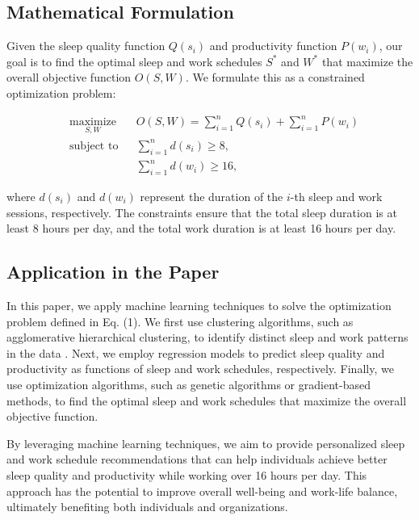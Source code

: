 \subsection{Mathematical Formulation}

Given the sleep quality function $Q(s_i)$ and productivity function $P(w_i)$, our goal is to find the optimal sleep and work schedules $S^*$ and $W^*$ that maximize the overall objective function $O(S, W)$. We formulate this as a constrained optimization problem:

\begin{equation}
\begin{aligned}
& \underset{S, W}{\text{maximize}}
& & O(S, W) = \sum_{i=1}^{n} Q(s_i) + \sum_{i=1}^{n} P(w_i) \\
& \text{subject to}
& & \sum_{i=1}^{n} d(s_i) \geq 8, \\
&&& \sum_{i=1}^{n} d(w_i) \geq 16,
\end{aligned}
\end{equation}

where $d(s_i)$ and $d(w_i)$ represent the duration of the $i$-th sleep and work sessions, respectively. The constraints ensure that the total sleep duration is at least 8 hours per day, and the total work duration is at least 16 hours per day.

\subsection{Application in the Paper}

In this paper, we apply machine learning techniques to solve the optimization problem defined in Eq. (1). We first use clustering algorithms, such as agglomerative hierarchical clustering, to identify distinct sleep and work patterns in the data \citep{uzir2020analytics}. Next, we employ regression models to predict sleep quality and productivity as functions of sleep and work schedules, respectively. Finally, we use optimization algorithms, such as genetic algorithms or gradient-based methods, to find the optimal sleep and work schedules that maximize the overall objective function.

By leveraging machine learning techniques, we aim to provide personalized sleep and work schedule recommendations that can help individuals achieve better sleep quality and productivity while working over 16 hours per day. This approach has the potential to improve overall well-being and work-life balance, ultimately benefiting both individuals and organizations.